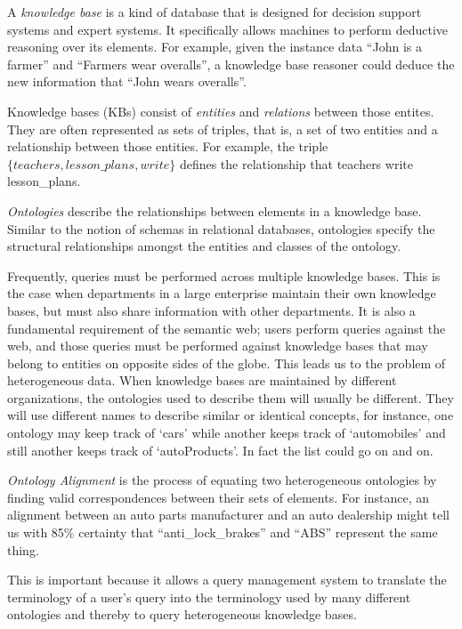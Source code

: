 \documentclass[letterpaper,twocolumn,12pt]{article}
\begin{document}
A \textit{knowledge base} is a kind of database that is designed 
for decision support systems and expert systems. It specifically allows
machines to perform deductive reasoning over its elements.
For example, given the instance data ``John is a farmer'' and ``Farmers
wear overalls'', a knowledge base reasoner could deduce the new information
that ``John wears overalls''.

Knowledge bases (KBs) consist of \textit{entities} and
\textit{relations} between those entites. They are often represented as sets of
triples, that is, a set of two entities and a relationship between those
entities. For example, the triple ${\{teachers, lesson\_plans, write\}}$
defines the relationship that teachers write lesson\_plans.

\textit{Ontologies} describe the relationships between elements in a knowledge base.
Similar to the notion of schemas in relational databases, ontologies specify
the structural relationships amongst the entities and classes of the ontology.

Frequently, queries must be performed across multiple knowledge bases. This is the
case when departments in a large enterprise maintain their own knowledge bases,
but must also share information with other departments. It is also a fundamental
requirement of the semantic web; users perform queries against the web,
and those queries must be performed against knowledge bases that may belong to 
entities on opposite sides of the globe. This leads us to the problem of heterogeneous
data. When knowledge bases are maintained by different organizations, the ontologies
used to describe them will usually be different. They will use different names
to describe similar or identical concepts, for instance, one ontology may keep track
of `cars' while another keeps track of `automobiles' and still another keeps track of 
`autoProducts'. In fact the list could go on and on.

\textit{Ontology Alignment} is the process of equating two heterogeneous ontologies by
finding valid correspondences between their sets of elements. 
%
For instance, an alignment between an auto parts manufacturer and an auto dealership
might tell us with 85\% certainty that ``anti\_lock\_brakes'' and ``ABS'' represent
the same thing.

This is important because it allows a query management system to translate the terminology
of a user's query into the terminology used by many different ontologies and thereby
to query heterogeneous knowledge bases.
\end{document}
